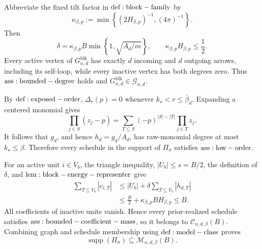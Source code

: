 Abbreviate the fixed tilt factor in \({\rm def:block-family}\) by
\[
\kappa_{\beta,p}:=\min\!\left\{(2H_{\beta,p})^{-1},(4\pi)^{-1}\right\}.
\]
Then
\[
\delta=\kappa_{\beta,p}B\min\!\left\{1,\sqrt{A_d/m}\right\},
\qquad
\kappa_{\beta,p}H_{\beta,p}\le\frac12.
\]
Every active vertex of \(G_{n,d}^{\mathrm{blk}}\) has exactly \(d\) incoming and \(d\) outgoing arrows, including its self-loop, while every inactive vertex has both degrees zero. Thus \({\rm ass:bounded-degree}\) holds and \(G_{n,d}^{\mathrm{blk}}\in\mathcal G_{n,d}\).

By \({\rm def:exposed-order}\), \(\Delta_r(p)=0\) whenever \(k_\star<r\le\bar\beta_d\). Expanding a centered monomial gives
\[
\prod_{j\in S}(z_j-p)
=\sum_{T\subseteq S}(-p)^{|S|-|T|}\prod_{j\in T}z_j.
\]
It follows that \(g_d\), and hence \(h_d=g_d/A_d\), has raw-monomial degree at most \(k_\star\le\beta\). Therefore every schedule in the support of \(\Pi_\sigma\) satisfies \({\rm ass:low-order}\).

For an active unit \(i\in V_b\), the triangle inequality, \(|U_b|\le s=B/2\), the definition of \(\delta\), and \({\rm lem:block-energy-representer}\) give
\[
\begin{aligned}
\sum_{T\subseteq V_b}|c_{i,T}|
&\le |U_b|+\delta\sum_{T\subseteq V_b}|h_{d,T}|\\
&\le \frac B2+\kappa_{\beta,p}BH_{\beta,p}
\le B.
\end{aligned}
\]
All coefficients of inactive units vanish. Hence every prior-realized schedule satisfies \({\rm ass:bounded-coefficient-mass}\), so it belongs to \(\mathcal C_{n,d,\beta}(B)\). Combining graph and schedule membership using \({\rm def:model-class}\) proves
\[
\operatorname{supp}(\Pi_\sigma)\subseteq\mathcal M_{n,d,\beta}(B).
\]